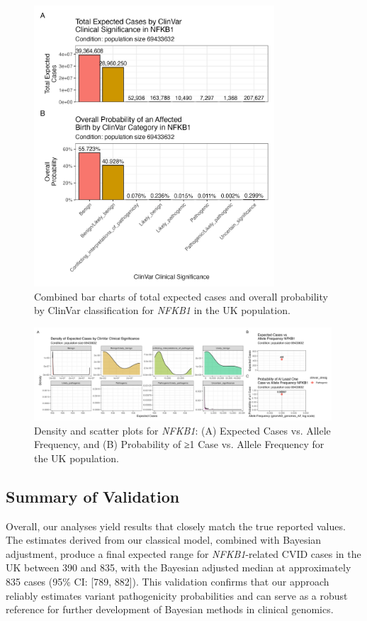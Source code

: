 \documentclass[a4paper,12pt]{article}
\begin{document}
\begin{figure}[H]
  \centering
  \includegraphics[width=0.8\textwidth]{../images/nfkb1_combined_bar_charts.png}
  \caption{Combined bar charts of total expected cases and overall probability by ClinVar classification for \textit{NFKB1} in the UK population.}
  \label{fig:nfkb1_combined_bar_charts}
\end{figure}

\begin{figure}[H]
  \centering
  \includegraphics[width=0.99\textwidth]{../images/nfkb1_scatterdense_expected_prob.png}
  \caption{Density and scatter plots for \textit{NFKB1}: (A) Expected Cases vs. Allele Frequency, and (B) Probability of ≥1 Case vs. Allele Frequency for the UK population.}
  \label{fig:nfkb1_scatterdense_expected_prob}
\end{figure}

\subsection{Summary of Validation}
Overall, our analyses yield results that closely match the true reported values. The estimates derived from our classical model, combined with Bayesian adjustment, produce a final expected range for \textit{NFKB1}-related CVID cases in the UK between 390 and 835, with the Bayesian adjusted median at approximately 835 cases (95\% CI: [789, 882]). This validation confirms that our approach reliably estimates variant pathogenicity probabilities and can serve as a robust reference for further development of Bayesian methods in clinical genomics.
\end{document}
